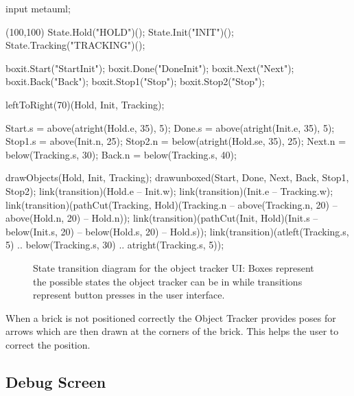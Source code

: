 \begin{empfile}[ObjectTrackerStates]
\begin{empcmds}
input metauml;
\end{empcmds}
\begin{empdef}[ObjectTrackerStates](100,100)
    State.Hold("HOLD")();
    State.Init("INIT")();
    State.Tracking("TRACKING")();
    
    boxit.Start("StartInit");
    boxit.Done("DoneInit");
    boxit.Next("Next");
    boxit.Back("Back");
    boxit.Stop1("Stop");
    boxit.Stop2("Stop");
    
    leftToRight(70)(Hold, Init, Tracking);
    
    Start.s = above(atright(Hold.e, 35), 5);
    Done.s = above(atright(Init.e, 35), 5);
    Stop1.s = above(Init.n, 25);
    Stop2.n = below(atright(Hold.se, 35), 25);
    Next.n = below(Tracking.s, 30);
    Back.n = below(Tracking.s, 40);
    
    drawObjects(Hold, Init, Tracking);
    drawunboxed(Start, Done, Next, Back, Stop1, Stop2);
    link(transition)(Hold.e -- Init.w);
    link(transition)(Init.e -- Tracking.w);
    link(transition)(pathCut(Tracking, Hold)(Tracking.n -- above(Tracking.n, 20) -- above(Hold.n, 20) -- Hold.n));
    link(transition)(pathCut(Init, Hold)(Init.s -- below(Init.s, 20) -- below(Hold.s, 20) -- Hold.s));
    link(transition)(atleft(Tracking.s, 5) .. below(Tracking.s, 30) .. atright(Tracking.s, 5));
\end{empdef}
\end{empfile}
\begin{figure}
    \centering
    \caption[State transition diagram for the object tracker UI]{State transition diagram for the object tracker UI: Boxes represent the possible states the object tracker can be in while transitions represent button presses in the user interface.
      \label{fig:ObjectTrackerStates}}
\end{figure}

When a brick is not positioned correctly the Object Tracker provides poses for arrows which are then drawn at the corners of the brick. This helps the user to correct the position.

\subsection{Debug Screen}

